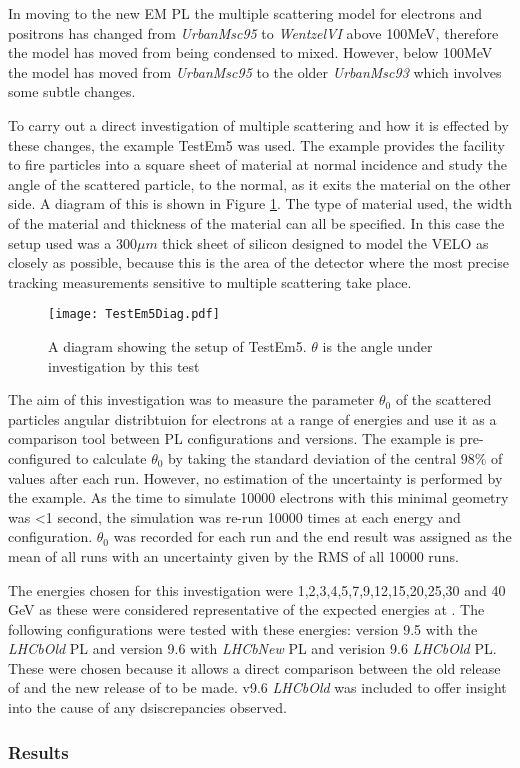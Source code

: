In moving to the new EM PL the multiple scattering model for electrons and positrons has changed from \textit{UrbanMsc95} to \textit{WentzelVI} above 100MeV, therefore the model has moved from being condensed to mixed.  However, below 100MeV the model has moved from \textit{UrbanMsc95} to the older \textit{UrbanMsc93} which involves some subtle changes. %

To carry out a direct investigation of multiple scattering and how it is effected by these changes, the \geant example TestEm5 was used. The example provides the facility to fire particles into a square sheet of material at normal incidence and study the angle of the scattered particle, to the normal, as it exits the material on the other side. A diagram of this is shown in Figure \ref{fig:TestDiam}.  The type of material used, the width of the material and thickness of the material can all be specified. In this case the setup used was a $300 \mu m$ thick sheet of silicon designed to model the \lhcb VELO as closely as possible, because this is the area of the detector where the most precise tracking measurements sensitive to multiple scattering take place.
\begin{figure}[h]
  \centering
  \texttt{[image: TestEm5Diag.pdf]}
  \caption{A diagram showing the setup of TestEm5.  $\theta$ is the angle under investigation by this test}
  \label{fig:TestDiam}
\end{figure}

The aim of this investigation was to measure the parameter $\theta_0$ of the scattered particles angular distribtuion for electrons at a range of energies and use it as a comparison tool between PL configurations and \geant versions.  The \geant example is pre-configured to calculate $\theta_0$ by taking the standard deviation of the central $98\%$ of values after each run.  However, no estimation of the uncertainty is performed by the example. As the time to simulate 10000 electrons with this minimal geometry was <1 second, the simulation was re-run 10000 times at each energy and configuration.  $\theta_0$ was recorded for each run and the end result was assigned as the mean of all runs with an uncertainty given by the RMS of all 10000 runs.

The energies chosen for this investigation were 1,2,3,4,5,7,9,12,15,20,25,30 and 40 GeV as these were considered representative of the expected energies at \lhcb. The following configurations were tested with these energies: \geant version 9.5 with the \textit{LHCbOld} PL and version 9.6 with \textit{LHCbNew} PL and verision 9.6 \textit{LHCbOld} PL.  These were chosen because it allows a direct comparison between the old release of \geant and the new release of \geant to be made.  v9.6 \textit{LHCbOld} was included to offer insight into the cause of any dsiscrepancies observed.

\subsubsection{Results}
\label{sec:MscResults}

\clearpage

